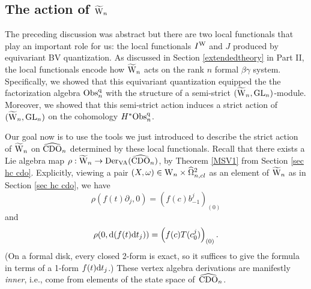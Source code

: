 %
%


\subsection{The action of $\widetilde{{{\rm W}}}_n$}

The preceding discussion was abstract but there are two local functionals that play an important role for us:
the local functionals $I^{{\rm W}}$ and $J$ produced by equivariant BV quantization.
As discussed in Section \ref{extendedtheory} in Part II, the local functionals encode how $\widetilde{{{\rm W}}}_n$ acts on 
the rank $n$ formal $\beta\gamma$ system.
Specifically, we showed that this equivariant quantization equipped the the factorization algebra
${\rm Obs}^{{\rm q}}_n$ with the structure of a semi-strict $(\widetilde{{{\rm W}}}_n,{\rm GL}_n)$-module. 
Moreover, we showed that this semi-strict action induces a strict action of $(\widetilde{{{\rm W}}}_n,{\rm GL}_n)$ on the cohomology $H^*{\rm Obs}^{{\rm q}}_n$.

Our goal now is to use the tools we just introduced to describe the strict action of $\widetilde{{{\rm W}}}_n$ on $\widehat{\rm CDO}_n$
determined by these local functionals. 
Recall that there exists a Lie algebra map $\rho : \widetilde{{{\rm W}}}_n \to {\rm Der}_{{\rm VA}}(\widehat{\rm CDO}_n)$,
by Theorem \ref{MSV1} from Section \ref{sec hc cdo}.
Explicitly, viewing a pair $(X, \omega) \in {{\rm W}_n} \times \widehat{\Omega}^2_{n,cl}$ as an element of $\widetilde{{{\rm W}}}_n$
as in Section \ref{sec hc cdo}, 
we have
\[
\rho(f(t) \partial_j,0) = (f(c) b_{-1}^j)_{(0)}
\]
and
\[
\rho(0, {\rm d}(f(t) {\rm d} t_j)) = \left(f(c) T (c_0^{j})\right)_{(0)}.
\]
(On a formal disk, every closed 2-form is exact, so it suffices to give the formula in terms of a 1-form $f(t) {\rm d} t_j$.)
These vertex algebra derivations are manifestly \emph{inner}, i.e., come from elements of the state space of~$\widehat{\rm CDO}_n$.


